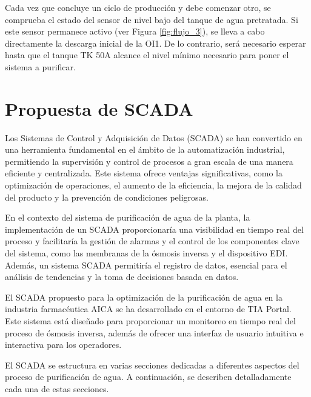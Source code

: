 Cada vez que concluye un ciclo de producción y debe comenzar otro, se comprueba
el estado del sensor de nivel bajo del tanque de agua pretratada. Si este
sensor permanece activo (ver Figura \ref{fig:flujo_3}), se lleva a cabo directamente la
descarga inicial de la OI1. De lo contrario, será necesario esperar hasta que
el tanque TK 50A alcance el nivel mínimo necesario para poner el sistema a purificar.




\section{Propuesta de SCADA}
\label{sec:scada_proposal}

Los Sistemas de Control y Adquisición de Datos (SCADA) se han convertido en una herramienta fundamental en el ámbito de la automatización industrial, permitiendo la supervisión y control de procesos a gran escala de una manera eficiente y centralizada. Este sistema ofrece ventajas significativas, como la optimización de operaciones, el aumento de la eficiencia, la mejora de la calidad del producto y la prevención de condiciones peligrosas.

En el contexto del sistema de purificación de agua de la planta, la implementación de un SCADA proporcionaría una visibilidad en tiempo real del proceso y facilitaría la gestión de alarmas y el control de los componentes clave del sistema, como las membranas de la ósmosis inversa y el dispositivo EDI. Además, un sistema SCADA permitiría el registro de datos, esencial para el análisis de tendencias y la toma de decisiones basada en datos.

El SCADA propuesto para la optimización de la purificación de agua en la industria farmacéutica AICA se ha desarrollado en el entorno de TIA Portal. Este sistema está diseñado para proporcionar un monitoreo en tiempo real del proceso de ósmosis inversa, además de ofrecer una interfaz de usuario intuitiva e interactiva para los operadores.


El SCADA se estructura en varias secciones dedicadas a diferentes aspectos del proceso de purificación de agua. A continuación, se describen detalladamente cada una de estas secciones.

